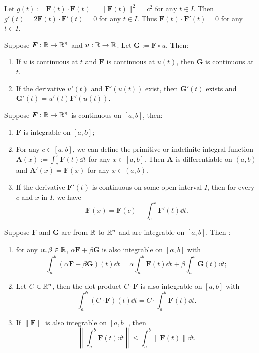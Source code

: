     \begin{proofenv}
        Let $g(t) := \bm F(t)\cdot \bm F(t) = \| \bm F(t)\|^2 = c^2$ for any $t\in I$. Then $g'(t) = 2 \bm F(t)\cdot \bm F'(t) = 0$ for any $t\in I$. Thus $\bm F(t)\cdot \bm F'(t) = 0$ for any $t\in I$.
    \end{proofenv}
    \begin{theoremenv}
        Suppose $\bm F:\mathbb{R} \to \mathbb{R}^n$ and $u:\mathbb{R} \to \mathbb{R}$. Let $\bm G:=\bm F \circ u$. Then:
        \begin{enumerate}[label=(\arabic*)]
            \item If $u$ is continuous at $t$ and $\bm F$ is continuous at $u(t)$, then $\bm G$ is continuous at $t$.
            \item If the derivative $u'(t)$ and $\bm F'(u(t))$ exist, then $\bm G'(t)$ exists and $\bm G'(t) = u'(t) \bm F'(u(t))$.
        \end{enumerate}
    \end{theoremenv}
    \begin{theoremenv}
        Suppose $\bm F:\mathbb{R} \to \mathbb{R}^n$ is continuous on $[a,b]$, then:
        \begin{enumerate}[label=(\arabic*)]
            \item $\bm F$ is integrable on $[a,b]$;
            \item For any $c\in [a,b]$, we can define the primitive or indefinite integral function $\bm A(x) := \displaystyle \int_c^x \bm F(t) \dd t$ for any $x\in [a,b]$. Then $\bm A$ is differentiable on $(a,b)$ and $\bm A'(x) = \bm F(x)$ for any $x\in (a,b)$.
            \item If the derivative $\bm F'(t)$ is continuous on some open interval $I$, then for every $c$ and $x$ in $I$, we have
            $$ \bm F(x) = \bm F(c) + \int_c^x \bm F'(t) \dd t. $$
        \end{enumerate}
    \end{theoremenv}
    \begin{theoremenv}
        Suppose $\bm F$ and $\bm G$ are from $\mathbb{R}$ to $\mathbb{R}^n$ and are integrable on $[a,b]$. Then :
        \begin{enumerate}[label=(\arabic*)]
            \item for any $\alpha , \beta \in \mathbb{R}$, $\alpha \bm F + \beta \bm G$ is also integrable on $[a,b]$ with
            $$ \int_a^b (\alpha \bm F + \beta \bm G)(t) \dd t = \alpha \int_a^b \bm F(t) \dd t + \beta \int_a^b \bm G(t) \dd t; $$
            \item Let $C \in \mathbb{R}^n$, then the dot product $C \cdot \bm F$ is also integrable on $[a,b]$ with
            $$ \int_a^b (C\cdot \bm F)(t) \dd t = C \cdot \int_a^b \bm F(t) \dd t. $$
            \item If $\| \bm F \|$ is also integrable on $[a,b]$, then 
            $$ \left\| \int_a^b \bm F(t) \dd t \right\| \le \int_a^b \| \bm F(t)\| \dd t. $$
        \end{enumerate}
    \end{theoremenv}
